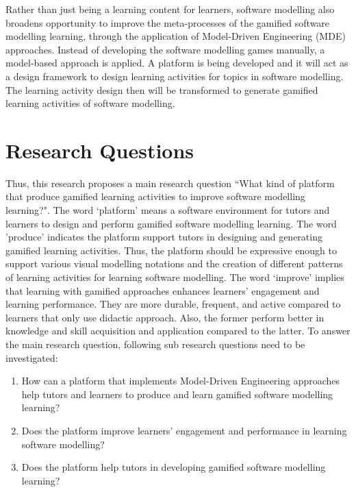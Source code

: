 \documentclass[12pt, a4paper]{report} \usepackage[titletoc]{appendix}
\begin{document}
Rather than just being a learning content for learners, software modelling also broadens opportunity to improve the meta-processes of the gamified software modelling learning, through the application of Model-Driven Engineering (MDE) approaches. Instead of developing the software modelling games manually, a model-based approach is applied. A platform is being developed and it will act as a design framework to design learning activities for topics in software modelling. The learning activity design then will be transformed to generate gamified learning activities of software modelling.  

\section{Research Questions}
Thus, this research proposes a main research question ``What kind of platform that produce gamified learning activities to improve software modelling learning?". The word `platform' means a software environment for tutors and learners to design and perform gamified software modelling learning. The word 'produce' indicates the platform support tutors in designing and generating gamified learning activities. Thus, the platform should be expressive enough to support various visual modelling notations and the creation of different patterns of learning activities for learning software modelling. The word `improve' implies that learning with gamified approaches enhances learners' engagement and learning performance. They are more durable, frequent, and active compared to learners that only use didactic approach. Also, the former perform better in knowledge and skill acquisition and application compared to the latter. To answer the main research question, following sub research questions need to be investigated:
\begin{enumerate}
\item How can a platform that implements Model-Driven Engineering approaches help tutors and learners to produce and learn gamified software modelling learning?
\item Does the platform improve learners' engagement and performance in learning software modelling?
\item Does the platform help tutors in developing gamified software modelling learning?
\end{enumerate}
\end{document}
